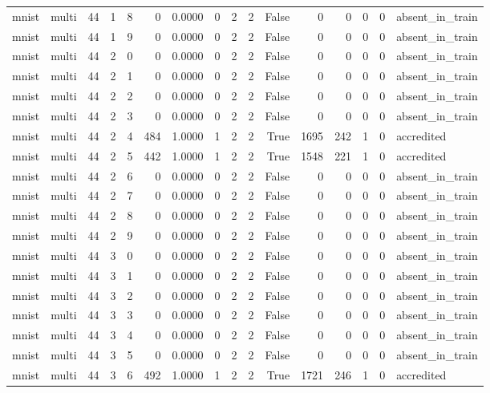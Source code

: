 \begin{tabular}{llrrrrrrrrrrrrrl}
mnist & multi & 44 & 1 & 8 & 0 & 0.0000 & 0 & 2 & 2 & False & 0 & 0 & 0 & 0 & absent\_in\_train \\
mnist & multi & 44 & 1 & 9 & 0 & 0.0000 & 0 & 2 & 2 & False & 0 & 0 & 0 & 0 & absent\_in\_train \\
mnist & multi & 44 & 2 & 0 & 0 & 0.0000 & 0 & 2 & 2 & False & 0 & 0 & 0 & 0 & absent\_in\_train \\
mnist & multi & 44 & 2 & 1 & 0 & 0.0000 & 0 & 2 & 2 & False & 0 & 0 & 0 & 0 & absent\_in\_train \\
mnist & multi & 44 & 2 & 2 & 0 & 0.0000 & 0 & 2 & 2 & False & 0 & 0 & 0 & 0 & absent\_in\_train \\
mnist & multi & 44 & 2 & 3 & 0 & 0.0000 & 0 & 2 & 2 & False & 0 & 0 & 0 & 0 & absent\_in\_train \\
mnist & multi & 44 & 2 & 4 & 484 & 1.0000 & 1 & 2 & 2 & True & 1695 & 242 & 1 & 0 & accredited \\
mnist & multi & 44 & 2 & 5 & 442 & 1.0000 & 1 & 2 & 2 & True & 1548 & 221 & 1 & 0 & accredited \\
mnist & multi & 44 & 2 & 6 & 0 & 0.0000 & 0 & 2 & 2 & False & 0 & 0 & 0 & 0 & absent\_in\_train \\
mnist & multi & 44 & 2 & 7 & 0 & 0.0000 & 0 & 2 & 2 & False & 0 & 0 & 0 & 0 & absent\_in\_train \\
mnist & multi & 44 & 2 & 8 & 0 & 0.0000 & 0 & 2 & 2 & False & 0 & 0 & 0 & 0 & absent\_in\_train \\
mnist & multi & 44 & 2 & 9 & 0 & 0.0000 & 0 & 2 & 2 & False & 0 & 0 & 0 & 0 & absent\_in\_train \\
mnist & multi & 44 & 3 & 0 & 0 & 0.0000 & 0 & 2 & 2 & False & 0 & 0 & 0 & 0 & absent\_in\_train \\
mnist & multi & 44 & 3 & 1 & 0 & 0.0000 & 0 & 2 & 2 & False & 0 & 0 & 0 & 0 & absent\_in\_train \\
mnist & multi & 44 & 3 & 2 & 0 & 0.0000 & 0 & 2 & 2 & False & 0 & 0 & 0 & 0 & absent\_in\_train \\
mnist & multi & 44 & 3 & 3 & 0 & 0.0000 & 0 & 2 & 2 & False & 0 & 0 & 0 & 0 & absent\_in\_train \\
mnist & multi & 44 & 3 & 4 & 0 & 0.0000 & 0 & 2 & 2 & False & 0 & 0 & 0 & 0 & absent\_in\_train \\
mnist & multi & 44 & 3 & 5 & 0 & 0.0000 & 0 & 2 & 2 & False & 0 & 0 & 0 & 0 & absent\_in\_train \\
mnist & multi & 44 & 3 & 6 & 492 & 1.0000 & 1 & 2 & 2 & True & 1721 & 246 & 1 & 0 & accredited \\

\end{tabular}
